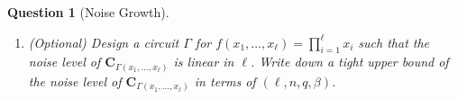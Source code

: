 \documentclass[10pt,twoside]{article}
\newif\ifsolution
\newcommand{\inputsol}[1]{\ifsolution\begin{tcolorbox}[breakable]\end{tcolorbox}\fi}
\theoremstyle{sltheorem}
\newtheorem{question}{Question}
\newcommand{\mat}[1]{\mathbf{#1}}
\begin{document}
\begin{question}[Noise Growth]
\begin{enumerate}[label=(\alph*)]
        Write down a tight upper bound of the noise level of $\mat{C}_{\Gamma_\mathtt{tree}(x_1,\ldots,x_\ell)}$ in terms of $(\ell,n,q,\beta)$. 
        \item (Optional) Design a circuit $\Gamma$ for $f(x_1,\ldots,x_\ell) = \prod_{i=1}^\ell x_i$ such that the noise level of $\mat{C}_{\Gamma(x_1,\ldots,x_\ell)}$ is linear in $\ell$. Write down a tight upper bound of the noise level of $\mat{C}_{\Gamma(x_1,\ldots,x_\ell)}$ in terms of $(\ell,n,q,\beta)$. 

    \end{enumerate}
\end{question}

\inputsol{gsw_noise_growth}
\end{document}
